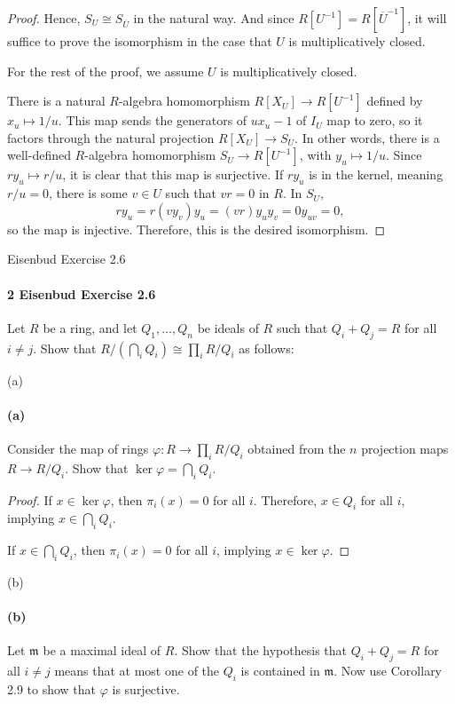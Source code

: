 \documentclass[12pt]{article}
\newlength{\myparskip}
\newenvironment{fullbox}{\begin{lrbox}{\savefullbox}\begin{minipage}{\dimexpr\textwidth-2\fboxsep\relax}\setlength{\parskip}{\myparskip}}{\end{minipage}\end{lrbox}\framebox[\textwidth]{\usebox{\savefullbox}}}
\newenvironment{pbox}[1][]{\begin{fullbox}\ifx#1\empty\else\paragraph{#1}\fi}{\end{fullbox}}
\renewcommand{\phi}{\varphi}
\newcommand{\<}{\langle}
\renewcommand{\>}{\rangle}
\newcommand{\isom}{\cong}
\newcommand{\clo}{\overline}
\newcommand{\mm}{\mathfrak{m}}
\begin{document}
\begin{proof}
    Hence, $S_U \isom S_{\clo{U}}$ in the natural way. And since $R[U^{-1}] = R[\clo{U}^{-1}]$, it will suffice to prove the isomorphism in the case that $U$ is multiplicatively closed.

    For the rest of the proof, we assume $U$ is multiplicatively closed.
    
    There is a natural $R$-algebra homomorphism $R[X_U] \to R[U^{-1}]$ defined by $x_u \mapsto 1/u$. This map sends the generators of $ux_u - 1$ of $I_U$ map to zero, so it factors through the natural projection $R[X_U] \to S_U$. In other words, there is a well-defined $R$-algebra homomorphism $S_U \to R[U^{-1}]$, with $y_u \mapsto 1/u$. Since $ry_u \mapsto r/u$, it is clear that this map is surjective. If $ry_u$ is in the kernel, meaning $r/u = 0$, there is some $v \in U$ such that $vr = 0$ in $R$. In $S_U$,
    \[
        ry_u = r(vy_v)y_u = (vr)y_uy_v = 0y_{uv} = 0,
    \]
    so the map is injective. Therefore, this is the desired isomorphism.

\end{proof}

\newpage
\begin{pbox}[2 Eisenbud Exercise 2.6]
    Let $R$ be a ring, and let $Q_1, \dots, Q_n$ be ideals of $R$ such that $Q_i + Q_j = R$ for all $i \ne j$. Show that $R/(\bigcap_i Q_i) \isom \prod_i R/Q_i$ as follows:
\end{pbox}

\begin{pbox}[(a)]
    Consider the map of rings $\phi : R \to \prod_i R/Q_i$ obtained from the $n$ projection maps $R \to R/Q_i$. Show that $\ker\phi = \bigcap_i Q_i$.
\end{pbox}

\begin{proof}
    If $x \in \ker\phi$, then $\pi_i(x) = 0$ for all $i$. Therefore, $x \in Q_i$ for all $i$, implying $x \in \bigcap_i Q_i$.

    If $x \in \bigcap_i Q_i$, then $\pi_i(x) = 0$ for all $i$, implying $x \in \ker\phi$.

\end{proof}

\begin{pbox}[(b)]
    Let $\mm$ be a maximal ideal of $R$. Show that the hypothesis that $Q_i + Q_j = R$ for all $i \ne j$ means that at most one of the $Q_i$ is contained in $\mm$. Now use Corollary 2.9 to show that $\phi$ is surjective.
\end{pbox}
\end{document}
